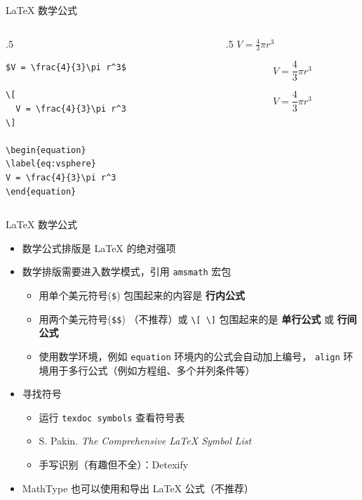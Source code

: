 \begin{frame}[fragile]{\LaTeX{} 数学公式}

  \begin{columns}
    \begin{column}{.5\textwidth}
      \begin{lstlisting}[basicstyle=\ttfamily\small]
$V = \frac{4}{3}\pi r^3$

\[
  V = \frac{4}{3}\pi r^3
\]

\begin{equation}
\label{eq:vsphere}
V = \frac{4}{3}\pi r^3
\end{equation}
\end{lstlisting}
    \end{column}

    \begin{column}{.5\textwidth}
      $V = \frac{4}{3}\pi r^3$

      \[
        V = \frac{4}{3}\pi r^3
      \]

      \begin{equation}
        \label{eq:vsphere}
        V = \frac{4}{3}\pi r^3
      \end{equation}
    \end{column}
  \end{columns}

\end{frame}

\begin{frame}[fragile]{\LaTeX{} 数学公式}
  \begin{itemize}
    \item 数学公式排版是 \LaTeX{} 的绝对强项
    \item 数学排版需要进入数学模式，引用 \texttt{amsmath} 宏包
          \begin{itemize}
            \item 用单个美元符号(\verb|$|) 包围起来的内容是 {\bf 行内公式}
            \item 用两个美元符号(\verb|$$|) （不推荐）或
                  \verb|\[ \]| 包围起来的是 {\bf 单行公式} 或 {\bf 行间公式}
            \item 使用数学环境，例如 \texttt{equation} 环境内的公式会自动加上编号，
                  \texttt{align} 环境用于多行公式（例如方程组、多个并列条件等）
          \end{itemize}
    \item 寻找符号
          \begin{itemize}
            \item 运行 \texttt{texdoc symbols} 查看符号表
            \item S. Pakin. \emph{The Comprehensive \LaTeX{} Symbol List}
            \item 手写识别（有趣但不全）：Detexify 
          \end{itemize}
    \item MathType 也可以使用和导出 \LaTeX{} 公式（不推荐）
  \end{itemize}
\end{frame}

